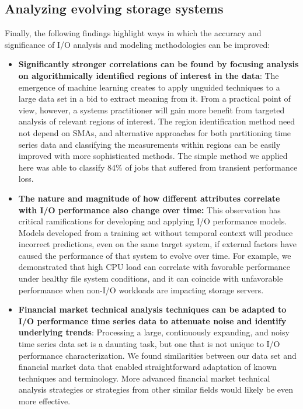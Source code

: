 \subsection{Analyzing evolving storage systems}

Finally, the following findings highlight ways in which the accuracy and significance of I/O analysis and modeling methodologies can be improved:

\begin{itemize}[leftmargin=*]

\item \textbf{Significantly stronger correlations can be found by focusing analysis on algorithmically identified regions of interest in the data}:
The emergence of machine learning creates to apply unguided techniques to a large data set in a bid to extract meaning from it.
From a practical point of view, however, a systems practitioner will gain more benefit from targeted analysis of relevant regions of interest.
The region identification method need not depend on SMAs, and alternative approaches for both partitioning time series data and classifying the measurements within regions can be easily improved with more sophisticated methods.
The simple method we applied here was able to classify 84\% of jobs that suffered from transient performance loss.


\item \textbf{The nature and magnitude of how different attributes correlate with I/O performance also change over time:}
This observation has critical ramifications for developing and applying I/O performance models.
Models developed from a training set without temporal context will produce incorrect predictions, even on the same target system, if
external factors have caused the performance of that system to evolve over time.
For example, we demonstrated that high CPU load can correlate with favorable performance under healthy file system conditions, and it can coincide with unfavorable performance when non-I/O workloads are impacting storage servers.

\item \textbf{Financial market technical analysis techniques can be adapted to I/O performance time series data to attenuate noise and identify underlying trends}:
Processing a large, continuously expanding, and noisy time series data set is a daunting task, but one that is not unique to I/O performance characterization.
We found similarities between our data set and financial market data that enabled straightforward adaptation of known techniques and terminology.
More advanced financial market technical analysis strategies or strategies from other similar fields would likely be even more effective.

\end{itemize}